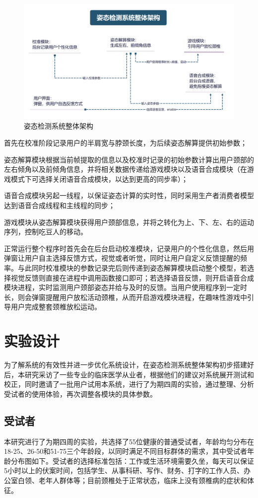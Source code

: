 \documentclass[12pt,a4paper]{article}%
\begin{document}
\begin{figure}[H]
\centering
\includegraphics[width=.9\textwidth]{./Part3-Design.pic/image-20230102181707678-16726546436221.png}
\caption{姿态检测系统整体架构}
\end{figure}
\par
首先在校准阶段记录用户的半肩宽与脖颈长度，为后续姿态解算提供初始参数；
\par
姿态解算模块根据当前帧提取的信息以及校准时记录的初始参数计算出用户颈部的左右倾角以及前倾角信息，并将相关数据传递给游戏模块以及语音合成模块（在游戏模式下可选择关闭语音合成模块，以达到更高的同步率）；
\par
语音合成模块另起一线程，以保证姿态计算的实时性，同时采用生产者消费者模型达到语音合成线程和主线程的同步；
\par
游戏模块从姿态解算模块获得用户颈部信息，并将之转化为上、下、左、右的运动序列，控制吃豆人的移动。
\par
正常运行整个程序时首先会在后台启动校准模块，记录用户的个性化信息，然后用弹窗让用户自主选择反馈方式，视觉或者听觉，同时让用户自定义反馈提醒的频率。与此同时校准模块的参数记录完后则传递到姿态解算模块启动整个模型，若选择视觉反馈则直接在进程中调用函数接口即可；若选择语音反馈，则开启语音合成模块进程，实时监测用户颈部姿态并给与及时的反馈。当用户使用程序到一定时长，则会弹窗提醒用户放松活动颈椎，从而开启游戏模块进程，在趣味性游戏中引导用户完成整套颈椎放松运动。


\section{实验设计}
为了解系统的有效性并进一步优化系统设计，在姿态检测系统整体架构初步搭建好后，本研究采访了一些专业的临床医学从业者，根据他们的建议对系统展开测试和校正，同时邀请了一批用户试用本系统，进行了为期四周的实验，通过整理、分析受试者的使用体验，再次调整各模块的具体参数。
\subsection{受试者}
本研究进行了为期四周的实验，共选择了55位健康的普通受试者，年龄均匀分布在18-25、26-50和51-75三个年龄段，以同时满足不同目标群体的需求，其中受试者年龄分布图如下。受试者的选择标准包括：工作或生活环境需要久坐，每天可以保证5小时以上的伏案时间，包括学生、从事科研、写作、财务、打字的工作人员、办公室白领、老年人群体等；目前颈椎处于正常状态，临床上没有颈椎病的症状和体征。
\end{document}
